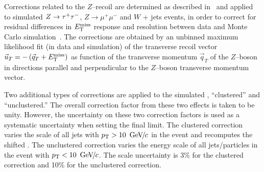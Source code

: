 Corrections related to the $Z$--recoil are determined as described
in~\cite{CMS_AN_2010-332} and applied to simulated $Z \to \tau^+\tau^-$, $Z \rightarrow
\mu^+\mu^-$ and $W$ + jets events, in order to correct for residual differences
in $E_{\mathrm{T}}^{\text{miss}}$ response and resolution between data and Monte Carlo
simulation~\cite{CMS_AN_2010-460}. The corrections are obtained by an unbinned
maximum likelihood fit (in data and simulation) of the transverse recoil vector
$\vec{u}_{T} = -\left( \vec{q}_{T} + E_{\mathrm{T}}^{\text{miss}} \right)$ as function of the transverse
momentum $\vec{q}_{T}$ of the $Z$--boson in directions parallel and
perpendicular to the $Z$--boson transverse momentum vector.  

Two additional types of corrections are applied to the simulated \MET,
``clustered'' and ``unclustered.''  The overall correction factor from these two
effects is taken to be unity.  However, the uncertainty on these two correction
factors is used as a systematic uncertainty when setting the final limit. The
clustered \MET correction varies the scale of all jets with \mbox{$p_{\mathrm{T}} >
10~{\,\text{Ge\hspace{-.08em}V\hspace{-0.16em}/\hspace{-0.08em}}c}$} in the event and recomputes the shifted \MET\@.  The unclustered \MET
correction varies the energy scale of all jets/particles in the event with
\mbox{$p_{\mathrm{T}} < 10~{\,\text{Ge\hspace{-.08em}V\hspace{-0.16em}/\hspace{-0.08em}}c}$}.  The scale uncertainty is 3\% for the clustered
correction and 10\% for the unclustered correction.

